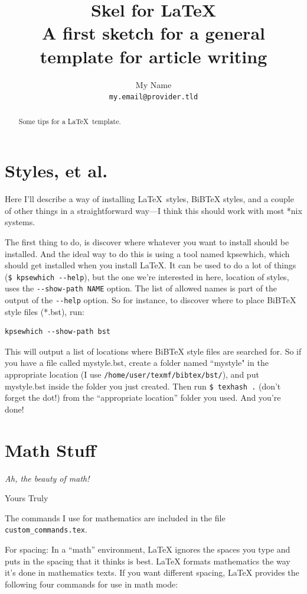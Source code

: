 \documentclass[a4paper,10pt,twocolumn,usenames,dvipsnames]{article}
\title{\large\textbf{\huge Skel for \LaTeX}\\
A first sketch for a general template for article writing}
\author{My Name\\\texttt{my.email@provider.tld}}
\date{}
\begin{document}
\maketitle                                                 %

\begin{abstract}
  Some tips for a \LaTeX\ template.
\end{abstract}

\section{Styles, et al.}
  Here I'll describe a way of installing \LaTeX\ styles, BiBTeX styles, and a couple 
  of other things in a straightforward way---I think this should work with most 
  *nix systems.

  The first thing to do, is discover where whatever you want to install should 
  be installed. And the ideal way to do this is using a tool named kpsewhich, 
  which should get installed when you install LaTeX. It can be used to do a lot 
  of things (\verb+$ kpsewhich --help+), but the one we’re interested in here, 
  location of styles, uses the \verb+--show-path NAME+ option. The list of 
  allowed names is part of the output of the \verb+--help+ option. So for 
  instance, to discover where to place BiBTeX style files (*.bst), run:
  \begin{verbatim}
kpsewhich --show-path bst
  \end{verbatim}

  This will output a list of locations where BiBTeX style files are searched 
  for. So if you have a file called mystyle.bst, create a folder named 
  ``mystyle" in the appropriate location (I use 
  \verb+/home/user/texmf/bibtex/bst/+), and put mystyle.bst inside the folder 
  you just created. Then run \verb+$ texhash .+ (don’t forget the dot!) from the 
  ``appropriate location'' folder you used. And you're done!

\section{Math Stuff}
  \epigraph{\emph{Ah, the beauty of math!}}{Yours Truly}
  The commands I use for mathematics are included in the file 
  \texttt{custom\_commands.tex}.

  For spacing: In a ``math'' environment, LaTeX ignores the spaces you type and 
  puts in the spacing that it thinks is best. LaTeX formats mathematics the
  way it’s done in mathematics texts. If you want different spacing, LaTeX 
  provides the following four commands for use in math mode: 
\end{document}
